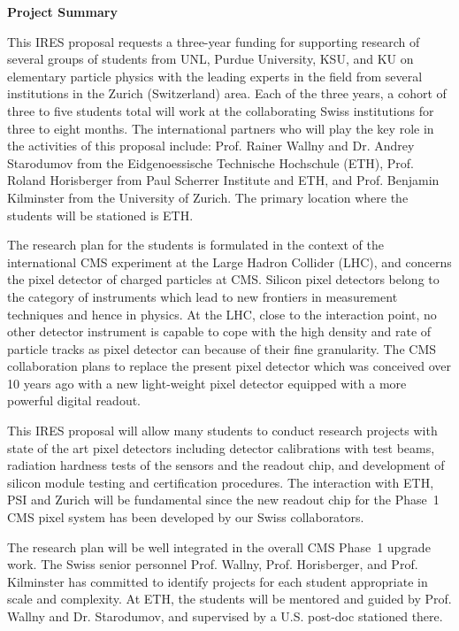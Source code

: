 \documentclass[12pt]{article}
\begin{document}
\pagestyle{empty}

\begin{center}
{\large\bf Project Summary}
\end{center}

This IRES proposal requests a three-year funding for supporting
research of several groups of students from UNL, Purdue University,
KSU, and KU on elementary particle physics with the leading experts in
the field from several institutions in the Zurich (Switzerland)
area. Each of the three years, a cohort of three to five students
total will work at the collaborating Swiss institutions for three to
eight months. The international partners who will play the key role in
the activities of this proposal include: Prof. Rainer Wallny and
Dr. Andrey Starodumov from the Eidgenoessische Technische Hochschule
(ETH), Prof. Roland Horisberger from Paul Scherrer Institute and ETH,
and Prof. Benjamin Kilminster from the University of Zurich. The
primary location where the students will be stationed is ETH.

The research plan for the students is formulated in the context of the
international CMS experiment at the Large Hadron Collider (LHC), and
concerns the pixel detector of charged particles at CMS. Silicon pixel
detectors belong to the category of instruments which lead to new
frontiers in measurement techniques and hence in physics. At the LHC,
close to the interaction point, no other detector instrument is
capable to cope with the high density and rate of particle tracks as
pixel detector can because of their fine granularity. The CMS
collaboration plans to replace the present pixel detector which was
conceived over 10 years ago
with a new
light-weight pixel detector equipped with a more powerful digital
readout.

This IRES proposal will allow many students to conduct research
projects with state of the art pixel detectors including detector
calibrations with test beams, radiation hardness tests of the sensors
and the readout chip, and development of silicon module testing and
certification procedures. The interaction with ETH, PSI and Zurich
will be fundamental since the new readout chip for the Phase~1 CMS
pixel system has been developed by our Swiss collaborators.

The research plan will be well integrated in the overall CMS Phase~1
upgrade work. The Swiss senior personnel Prof. Wallny,
Prof. Horisberger, and Prof. Kilminster has committed to identify
projects for each student appropriate in scale and complexity. At ETH,
the students will be mentored and guided by Prof. Wallny and
Dr. Starodumov, and supervised by a U.S. post-doc stationed there.
\end{document}
